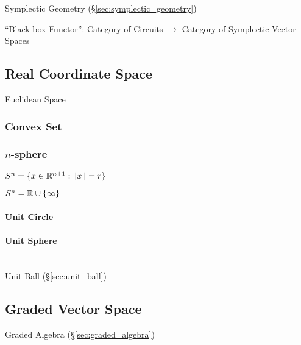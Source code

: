 Symplectic Geometry (\S\ref{sec:symplectic_geometry})

``Black-box Functor'': Category of Circuits $\rightarrow$ Category of
Symplectic Vector Spaces %



\subsection{Real Coordinate Space}\label{sec:real_space}

Euclidean Space %



\subsubsection{Convex Set}\label{sec:convex_set}

\subsubsection{$n$-sphere}\label{sec:n_sphere}

$S^n = \{ x \in \mathbb{R}^{n+1} : \|x\| = r \}$

$S^n = \mathbb{R} \cup \{\infty\}$



\paragraph{Unit Circle}\label{sec:unit_circle}

\paragraph{Unit Sphere}\label{sec:unit_sphere}
\hfill \\

Unit Ball (\S\ref{sec:unit_ball})



\subsection{Graded Vector Space}\label{sec:graded_vectorspace}

Graded Algebra (\S\ref{sec:graded_algebra})



